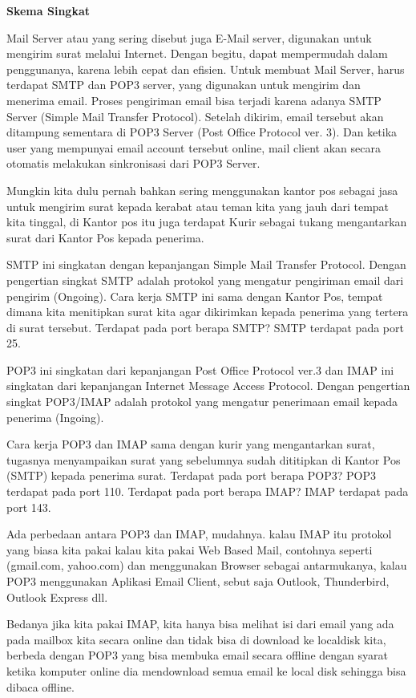 \textbf{Skema Singkat}\par \vspace{12pt}
Mail Server atau yang sering disebut juga E-Mail server, digunakan untuk mengirim surat melalui Internet. Dengan begitu, dapat mempermudah dalam penggunanya, karena lebih cepat dan efisien. Untuk membuat Mail Server, harus terdapat SMTP dan POP3 server, yang digunakan untuk mengirim dan menerima email. Proses pengiriman email bisa terjadi karena adanya SMTP Server (Simple Mail Transfer Protocol). Setelah dikirim, email tersebut akan ditampung sementara di POP3 Server (Post Office Protocol ver. 3). Dan ketika user yang mempunyai email account tersebut online, mail client akan secara otomatis melakukan sinkronisasi dari POP3 Server.
\par \vspace{12pt}
Mungkin kita dulu pernah bahkan sering menggunakan kantor pos sebagai jasa untuk mengirim surat kepada kerabat atau teman kita yang jauh dari tempat kita tinggal, di Kantor pos itu juga terdapat Kurir sebagai tukang mengantarkan surat dari Kantor Pos kepada penerima.
\par \vspace{12pt}
SMTP ini singkatan dengan kepanjangan Simple Mail Transfer Protocol. Dengan pengertian singkat SMTP adalah protokol yang mengatur pengiriman email dari pengirim (Ongoing).
Cara kerja SMTP ini sama dengan Kantor Pos, tempat dimana kita menitipkan surat kita agar dikirimkan kepada penerima yang tertera di surat tersebut.
Terdapat pada port berapa SMTP? SMTP terdapat pada port 25.
\par \vspace{12pt}
POP3 ini singkatan dari kepanjangan Post Office Protocol ver.3 dan IMAP ini singkatan dari kepanjangan Internet Message Access Protocol. Dengan pengertian singkat POP3/IMAP adalah protokol yang mengatur penerimaan email kepada penerima (Ingoing).\par \vspace{12pt}
Cara kerja POP3 dan IMAP sama dengan kurir yang mengantarkan surat, tugasnya menyampaikan surat yang sebelumnya sudah dititipkan di Kantor Pos (SMTP) kepada penerima surat.
Terdapat pada port berapa POP3? POP3 terdapat pada port 110.
Terdapat pada port berapa IMAP? IMAP terdapat pada port 143.

Ada perbedaan antara POP3 dan IMAP, mudahnya. kalau IMAP itu protokol yang biasa kita pakai kalau kita pakai Web Based Mail, contohnya seperti (gmail.com, yahoo.com) dan menggunakan Browser sebagai antarmukanya, kalau POP3 menggunakan Aplikasi Email Client, sebut saja Outlook, Thunderbird, Outlook Express dll.

Bedanya jika kita pakai IMAP, kita hanya bisa melihat isi dari email yang ada pada mailbox kita secara online dan tidak bisa di download ke localdisk kita, berbeda dengan POP3 yang bisa membuka email secara offline dengan syarat ketika komputer online dia mendownload semua email ke local disk sehingga bisa dibaca offline.